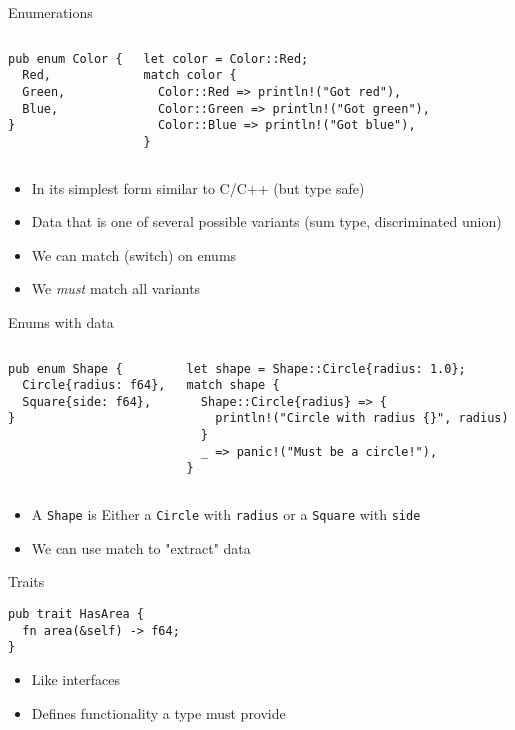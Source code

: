 \begin{frame}[fragile]{Enumerations}
\begin{columns}[t,onlytextwidth]
\begin{verbatim}
pub enum Color {
  Red,
  Green,
  Blue,
}
\end{verbatim}
\begin{verbatim}
let color = Color::Red;
match color {
  Color::Red => println!("Got red"),
  Color::Green => println!("Got green"),
  Color::Blue => println!("Got blue"),
}
\end{verbatim}
\end{columns}
  \begin{itemize}
    \item<1-> In its simplest form similar to C/C++ (but type safe)
    \item<1-> Data that is one of several possible variants (sum type, discriminated union)
    \item<2> We can match (switch) on enums
    \item<2> We \emph{must} match all variants
  \end{itemize}
\end{frame}

\begin{frame}[fragile]{Enums with data}
\begin{columns}[t,onlytextwidth]
\begin{verbatim}
pub enum Shape {
  Circle{radius: f64},
  Square{side: f64},
}
\end{verbatim}
\pause\begin{verbatim}
let shape = Shape::Circle{radius: 1.0};
match shape {
  Shape::Circle{radius} => {
    println!("Circle with radius {}", radius)
  }
  _ => panic!("Must be a circle!"),
}
\end{verbatim}
\end{columns}
\begin{itemize}
  \item<1-> A \texttt{Shape} is Either a \texttt{Circle} with \texttt{radius} or a
    \texttt{Square} with \texttt{side}
  \item<2-> We can use match to "extract" data
\end{itemize}
\end{frame}



\begin{frame}[fragile]{Traits}
\begin{verbatim}
pub trait HasArea {
  fn area(&self) -> f64;
}
\end{verbatim}
\begin{itemize}
	\item Like interfaces
	\item Defines functionality a type must provide
\end{itemize}
\end{frame}

